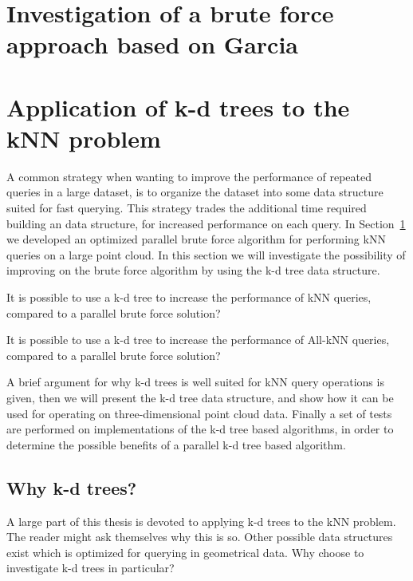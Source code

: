 \section{Investigation of a brute force approach based on Garcia} %
\label{sub:investigation_of_a_brute_force_approach_based_on_garcia}




\section{Application of k-d trees to the kNN problem} %
\label{sub:application_of_kd_trees_to_the_knn_problem}

A common strategy when wanting to improve the performance of repeated queries in a large dataset, is to organize the dataset into some data structure suited for fast querying. This strategy trades the additional time required building an data structure, for increased performance on each query. In Section~\ref{sub:investigation_of_a_brute_force_approach_based_on_garcia} we developed an optimized parallel brute force algorithm for performing kNN queries on a large point cloud. In this section we will investigate the possibility of improving on the brute force algorithm by using the k-d tree data structure.

\begin{myrq}
\label{rq:serial-kd-tree}
    It is possible to use a k-d tree to increase the performance of kNN queries, compared to a parallel brute force solution?
\end{myrq}

\begin{myrq}
\label{rq:serial-kd-tree-all-knn}
    It is possible to use a k-d tree to increase the performance of All-kNN queries, compared to a parallel brute force solution?
\end{myrq}

A brief argument for why k-d trees is well suited for kNN query operations is given, then we will present the k-d tree data structure, and show how it can be used for operating on three-dimensional point cloud data. Finally a set of tests are performed on implementations of the k-d tree based algorithms, in order to determine the possible benefits of a parallel k-d tree based algorithm.

\subsection{Why k-d trees?} %
\label{sub:why_k_d_trees_}
A large part of this thesis is devoted to applying k-d trees to the kNN problem. The reader might ask themselves why this is so. Other possible data structures exist which is optimized for querying in geometrical data. Why choose to investigate k-d trees in particular?

